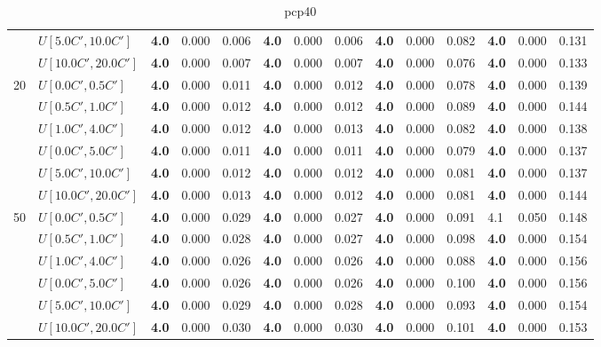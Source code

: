 \begin{table}[h]
{\begin{tabular}{|l|l||l|l|l||l|l|l||l|l|l||l|l|l|}
       & $U[5.0C',10.0C']$ & \textbf{4.0} & 0.000 & 0.006 & \textbf{4.0} & 0.000 & 0.006 & \textbf{4.0} & 0.000 & 0.082 & \textbf{4.0} & 0.000 & 0.131 \\
       & $U[10.0C',20.0C']$ & \textbf{4.0} & 0.000 & 0.007 & \textbf{4.0} & 0.000 & 0.007 & \textbf{4.0} & 0.000 & 0.076 & \textbf{4.0} & 0.000 & 0.133 \\
      \hline\hline
      \multirow{6}{*}{20} & $U[0.0C',0.5C']$ & \textbf{4.0} & 0.000 & 0.011 & \textbf{4.0} & 0.000 & 0.012 & \textbf{4.0} & 0.000 & 0.078 & \textbf{4.0} & 0.000 & 0.139 \\
       & $U[0.5C',1.0C']$ & \textbf{4.0} & 0.000 & 0.012 & \textbf{4.0} & 0.000 & 0.012 & \textbf{4.0} & 0.000 & 0.089 & \textbf{4.0} & 0.000 & 0.144 \\
       & $U[1.0C',4.0C']$ & \textbf{4.0} & 0.000 & 0.012 & \textbf{4.0} & 0.000 & 0.013 & \textbf{4.0} & 0.000 & 0.082 & \textbf{4.0} & 0.000 & 0.138 \\
       & $U[0.0C',5.0C']$ & \textbf{4.0} & 0.000 & 0.011 & \textbf{4.0} & 0.000 & 0.011 & \textbf{4.0} & 0.000 & 0.079 & \textbf{4.0} & 0.000 & 0.137 \\
       & $U[5.0C',10.0C']$ & \textbf{4.0} & 0.000 & 0.012 & \textbf{4.0} & 0.000 & 0.012 & \textbf{4.0} & 0.000 & 0.081 & \textbf{4.0} & 0.000 & 0.137 \\
       & $U[10.0C',20.0C']$ & \textbf{4.0} & 0.000 & 0.013 & \textbf{4.0} & 0.000 & 0.012 & \textbf{4.0} & 0.000 & 0.081 & \textbf{4.0} & 0.000 & 0.144 \\
      \hline\hline
      \multirow{6}{*}{50} & $U[0.0C',0.5C']$ & \textbf{4.0} & 0.000 & 0.029 & \textbf{4.0} & 0.000 & 0.027 & \textbf{4.0} & 0.000 & 0.091 & 4.1 & 0.050 & 0.148 \\
       & $U[0.5C',1.0C']$ & \textbf{4.0} & 0.000 & 0.028 & \textbf{4.0} & 0.000 & 0.027 & \textbf{4.0} & 0.000 & 0.098 & \textbf{4.0} & 0.000 & 0.154 \\
       & $U[1.0C',4.0C']$ & \textbf{4.0} & 0.000 & 0.026 & \textbf{4.0} & 0.000 & 0.026 & \textbf{4.0} & 0.000 & 0.088 & \textbf{4.0} & 0.000 & 0.156 \\
       & $U[0.0C',5.0C']$ & \textbf{4.0} & 0.000 & 0.026 & \textbf{4.0} & 0.000 & 0.026 & \textbf{4.0} & 0.000 & 0.100 & \textbf{4.0} & 0.000 & 0.156 \\
       & $U[5.0C',10.0C']$ & \textbf{4.0} & 0.000 & 0.029 & \textbf{4.0} & 0.000 & 0.028 & \textbf{4.0} & 0.000 & 0.093 & \textbf{4.0} & 0.000 & 0.154 \\
       & $U[10.0C',20.0C']$ & \textbf{4.0} & 0.000 & 0.030 & \textbf{4.0} & 0.000 & 0.030 & \textbf{4.0} & 0.000 & 0.101 & \textbf{4.0} & 0.000 & 0.153 \\
      \hline
      \end{tabular}
      }
      \caption{pcp40}
      \label{tab:pcp40}\end{table}


